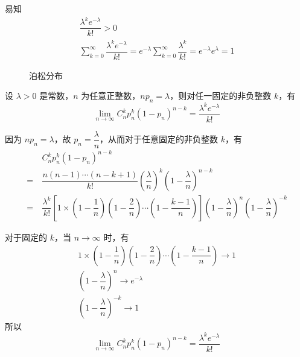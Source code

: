 易知
\begin{gather*}
    \dfrac{\lambda^k e^{-\lambda}}{k!} > 0\\
    \sum_{k=0}^\infty \dfrac{\lambda^k e^{-\lambda}}{k!} = e^{-\lambda} \sum_{k=0}^\infty \dfrac{\lambda^k}{k!} = e^{-\lambda} e^{\lambda}=1
\end{gather*}

\begin{figure}[htbp]
    \centering


    \caption{泊松分布}
\end{figure}

\begin{theorem}[(泊松定理)]
    设 $\lambda > 0$ 是常数，$n$ 为任意正整数，$n p_n=\lambda$，则对任一固定的非负整数 $k$，有
    $$
    \lim_{n\to\infty} C_n^k p_n^k (1-p_n)^{n-k} = \dfrac{\lambda^k e^{-\lambda}}{k!}
    $$
\end{theorem}

\begin{myproof}
    因为 $n p_n=\lambda$，故 $p_n=\dfrac{\lambda}{n}$，从而对于任意固定的非负整数 $k$，有
    $$
    \begin{aligned}
        & C_n^k p_n^k (1-p_n)^{n-k}\\
        =\ & \dfrac{n(n-1) \cdots (n-k+1)}{k!} \left( \dfrac{\lambda}{n} \right)^k \left( 1-\dfrac{\lambda}{n} \right)^{n-k}\\
        =\ & \dfrac{\lambda^k}{k!} \left[ 1 \times \left( 1-\dfrac{1}{n} \right) \left( 1-\dfrac{2}{n} \right) \cdots \left( 1-\dfrac{k-1}{n} \right) \right] \left( 1-\dfrac{\lambda}{n} \right)^n \left( 1-\dfrac{\lambda}{n} \right)^{-k}
    \end{aligned}
    $$

    对于固定的 $k$，当 $n\to\infty$ 时，有
    \begin{gather*}
        1 \times \left( 1-\dfrac{1}{n} \right) \left( 1-\dfrac{2}{n} \right) \cdots \left( 1-\dfrac{k-1}{n} \right) \to 1 \\
        \left( 1-\dfrac{\lambda}{n} \right)^n \to e^{-\lambda} \\
        \left( 1-\dfrac{\lambda}{n} \right)^{-k}\to 1
    \end{gather*}
    所以
    $$
    \lim_{n\to\infty} C_n^k p_n^k (1-p_n)^{n-k} = \dfrac{\lambda^k e^{-\lambda}}{k!}
    $$
\end{myproof}

